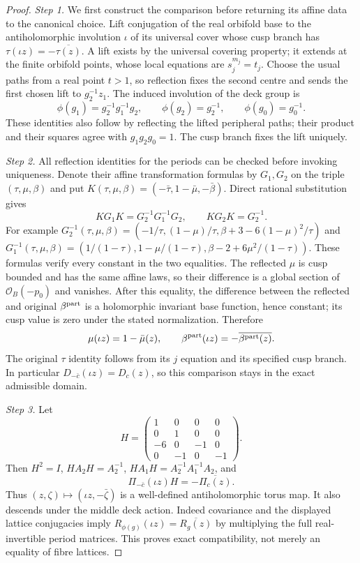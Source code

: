 \begin{proof}
\par\noindent\textit{Step 1.} We first construct the comparison before returning its affine data to the canonical choice. Lift conjugation of the real orbifold base to the antiholomorphic involution $\iota$ of its universal cover whose cusp branch has $\tau(\iota z)=-\overline{\tau(z)}$. A lift exists by the universal covering property; it extends at the finite orbifold points, whose local equations are $s_j^{m_j}=t_j$. Choose the usual paths from a real point $t>1$, so reflection fixes the second centre and sends the first chosen lift to $g_2^{-1}z_1$. The induced involution of the deck group is
\[
 \phi(g_1)=g_2^{-1}g_1^{-1}g_2,\qquad
 \phi(g_2)=g_2^{-1},\qquad \phi(g_0)=g_0^{-1}.
\]
These identities also follow by reflecting the lifted peripheral paths; their product and their squares agree with $g_1g_2g_0=1$. The cusp branch fixes the lift uniquely.

\par\noindent\textit{Step 2.} All reflection identities for the periods can be checked before invoking uniqueness. Denote their affine transformation formulas by $G_1,G_2$ on the triple $(\tau,\mu,\beta)$ and put $K(\tau,\mu,\beta)=(-\bar\tau,1-\bar\mu,-\bar\beta)$. Direct rational substitution gives
\[
 KG_1K=G_2^{-1}G_1^{-1}G_2,\qquad KG_2K=G_2^{-1}.
\]
For example $G_2^{-1}(\tau,\mu,\beta)=(-1/\tau,(1-\mu)/\tau,\beta+3-6(1-\mu)^2/\tau)$ and
$G_1^{-1}(\tau,\mu,\beta)=(1/(1-\tau),1-\mu/(1-\tau),\beta-2+6\mu^2/(1-\tau))$. These formulas verify every constant in the two equalities. The reflected $\mu$ is cusp bounded and has the same affine laws, so their difference is a global section of $\mathcal O_B(-p_0)$ and vanishes. After this equality, the difference between the reflected and original $\beta^{\rm part}$ is a holomorphic invariant base function, hence constant; its cusp value is zero under the stated normalization. Therefore
\[
 \mu(\iota z)=1-\bar\mu(z),\qquad
 \beta^{\rm part}(\iota z)=-\overline{\beta^{\rm part}(z)}.
\]
The original $\tau$ identity follows from its $j$ equation and its specified cusp branch. In particular $D_{-\bar c}(\iota z)=D_c(z)$, so this comparison stays in the exact admissible domain.

\par\noindent\textit{Step 3.} Let
\[
 H=\begin{pmatrix}1&0&0&0\\0&1&0&0\\-6&0&-1&0\\0&-1&0&-1\end{pmatrix}.
\]
Then $H^2=I$, $HA_2H=A_2^{-1}$, $HA_1H=A_2^{-1}A_1^{-1}A_2$, and
\[
 \Pi_{-\bar c}(\iota z)H=-\overline{\Pi_c(z)}.
\]
Thus $(z,\zeta)\mapsto(\iota z,-\bar\zeta)$ is a well-defined antiholomorphic torus map. It also descends under the middle deck action. Indeed covariance and the displayed lattice conjugacies imply $R_{\phi(g)}(\iota z)=\overline{R_g(z)}$ by multiplying the full real-invertible period matrices. This proves exact compatibility, not merely an equality of fibre lattices.


\end{proof}
